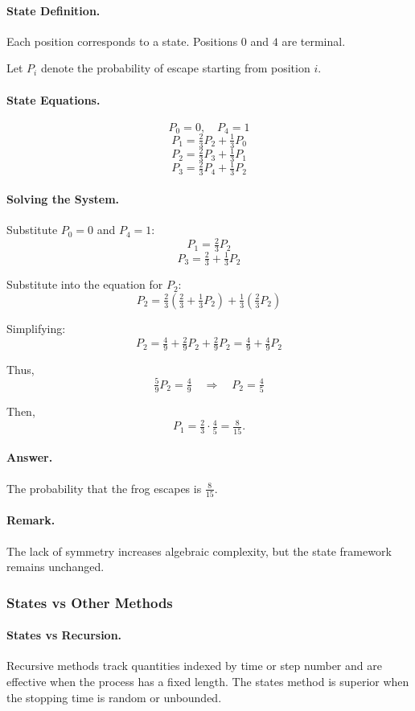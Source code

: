 \documentclass[12pt]{extarticle}
\begin{document}
\paragraph{State Definition.}
Each position corresponds to a state. Positions $0$ and $4$ are terminal.

Let $P_i$ denote the probability of escape starting from position $i$.

\paragraph{State Equations.}
\[
P_0 = 0, \quad P_4 = 1
\]
\[
P_1 = \tfrac{2}{3}P_2 + \tfrac{1}{3}P_0
\]
\[
P_2 = \tfrac{2}{3}P_3 + \tfrac{1}{3}P_1
\]
\[
P_3 = \tfrac{2}{3}P_4 + \tfrac{1}{3}P_2
\]

\paragraph{Solving the System.}
Substitute $P_0 = 0$ and $P_4 = 1$:
\[
P_1 = \tfrac{2}{3}P_2
\]
\[
P_3 = \tfrac{2}{3} + \tfrac{1}{3}P_2
\]

Substitute into the equation for $P_2$:
\[
P_2 = \tfrac{2}{3}\left(\tfrac{2}{3} + \tfrac{1}{3}P_2\right) + \tfrac{1}{3}\left(\tfrac{2}{3}P_2\right)
\]

Simplifying:
\[
P_2 = \tfrac{4}{9} + \tfrac{2}{9}P_2 + \tfrac{2}{9}P_2
= \tfrac{4}{9} + \tfrac{4}{9}P_2
\]

Thus,
\[
\tfrac{5}{9}P_2 = \tfrac{4}{9} \quad \Rightarrow \quad P_2 = \tfrac{4}{5}
\]

Then,
\[
P_1 = \tfrac{2}{3} \cdot \tfrac{4}{5} = \tfrac{8}{15}.
\]

\paragraph{Answer.}
The probability that the frog escapes is $\boxed{\tfrac{8}{15}}$.

\paragraph{Remark.}
The lack of symmetry increases algebraic complexity, but the state framework remains unchanged.

\subsubsection*{States vs Other Methods}

\paragraph{States vs Recursion.}
Recursive methods track quantities indexed by time or step number and are effective when the process has a fixed length. The states method is superior when the stopping time is random or unbounded.
\end{document}
